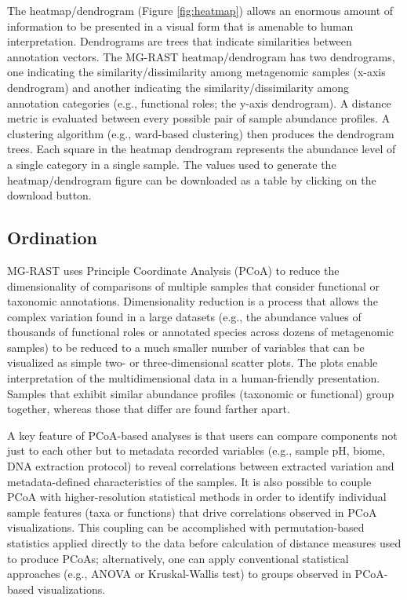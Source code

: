 \documentclass[12pt,fullpage]{report}
\begin{document}
The heatmap/dendrogram (Figure \ref{fig:heatmap}) allows an enormous amount of information to be presented in a visual form that is amenable to human interpretation. Dendrograms are trees that indicate similarities between annotation vectors. The MG-RAST heatmap/dendrogram has two dendrograms, one indicating the similarity/dissimilarity among metagenomic samples (x-axis dendrogram) and another indicating the similarity/dissimilarity among annotation categories (e.g., functional roles; the y-axis dendrogram). A distance metric is evaluated between every possible pair of sample abundance profiles. A clustering algorithm (e.g., ward-based clustering) then produces the dendrogram trees. Each square in the heatmap dendrogram represents the abundance level of a single category in a single sample. The values used to generate the heatmap/dendrogram figure can be downloaded as a table by clicking on the download button.
\subsection{Ordination}

MG-RAST uses Principle Coordinate Analysis (PCoA) to reduce the dimensionality of comparisons of multiple samples that consider functional or taxonomic annotations.
Dimensionality reduction is a process that allows the complex variation found in a large datasets (e.g., the abundance values of thousands of functional roles or annotated species across dozens of metagenomic samples) to be reduced to a much smaller number of variables that can be visualized as simple two- or three-dimensional scatter plots. The plots enable interpretation of the multidimensional data in a human-friendly presentation. Samples that exhibit similar abundance profiles (taxonomic or functional) group together, whereas those that differ are found farther apart.

A key feature of PCoA-based analyses is that users can compare components not just to each other but to metadata recorded variables (e.g., sample pH, biome, DNA extraction protocol) to reveal correlations between extracted variation and metadata-defined characteristics of the samples. It is also possible to couple PCoA with higher-resolution statistical methods in order to identify individual sample features (taxa or functions) that drive correlations observed in PCoA visualizations. This coupling can be accomplished with permutation-based statistics applied directly to the data before calculation of distance measures used to produce PCoAs; alternatively, one can apply conventional statistical approaches (e.g., ANOVA or Kruskal-Wallis test) to groups observed in PCoA-based visualizations.
\end{document}
